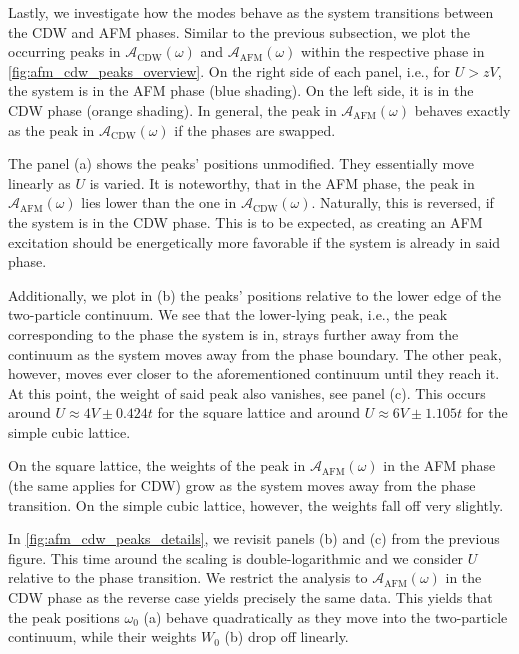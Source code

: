\documentclass[
    reprint, 
    aps,
    preprintnumbers,
    twocolumn,
    prb,
    superscriptaddress
]{revtex4-2}
\newcommand{\spectral}[1]{\mathcal{A}_\text{#1}  (\omega)}
\begin{document}
Lastly, we investigate how the modes behave as the system transitions between the CDW and AFM phases.
Similar to the previous subsection, we plot the occurring peaks in $\spectral{CDW}$ and $\spectral{AFM}$ within the respective phase in \autoref{fig:afm_cdw_peaks_overview}.
On the right side of each panel, i.e., for $U > zV$, the system is in the AFM phase (blue shading).
On the left side, it is in the CDW phase (orange shading).
In general, the peak in $\spectral{AFM}$ behaves exactly as the peak in $\spectral{CDW}$ if the phases are swapped.

The panel (a) shows the peaks' positions unmodified. They essentially move linearly as $U$ is varied.
It is noteworthy, that in the AFM phase, the peak in $\spectral{AFM}$ lies lower than the one in $\spectral{CDW}$.
Naturally, this is reversed, if the system is in the CDW phase.
This is to be expected, as creating an AFM excitation should be energetically more favorable if the system is already in said phase.

Additionally, we plot in (b) the peaks' positions relative to the lower edge of the two-particle continuum.
We see that the lower-lying peak, i.e., the peak corresponding to the phase the system is in, 
strays further away from the continuum as the system moves away from the phase boundary.
The other peak, however, moves ever closer to the aforementioned continuum until they reach it.
At this point, the weight of said peak also vanishes, see panel (c).
This occurs around $U \approx 4V \pm 0.424t$ for the square lattice and around $U \approx 6V \pm 1.105t$ for the simple cubic lattice.

On the square lattice, the weights of the peak in $\spectral{AFM}$ in the AFM phase (the same applies for CDW) grow as the system moves away from the phase transition.
On the simple cubic lattice, however, the weights fall off very slightly.

In \autoref{fig:afm_cdw_peaks_details}, we revisit panels (b) and (c) from the previous figure.
This time around the scaling is double-logarithmic and we consider $U$ relative to the phase transition.
We restrict the analysis to $\spectral{AFM}$ in the CDW phase as the reverse case yields precisely the same data.
This yields that the peak positions $\omega_0$ (a) behave quadratically as they move into the two-particle continuum,
while their weights $W_0$ (b) drop off linearly.

\end{document}

